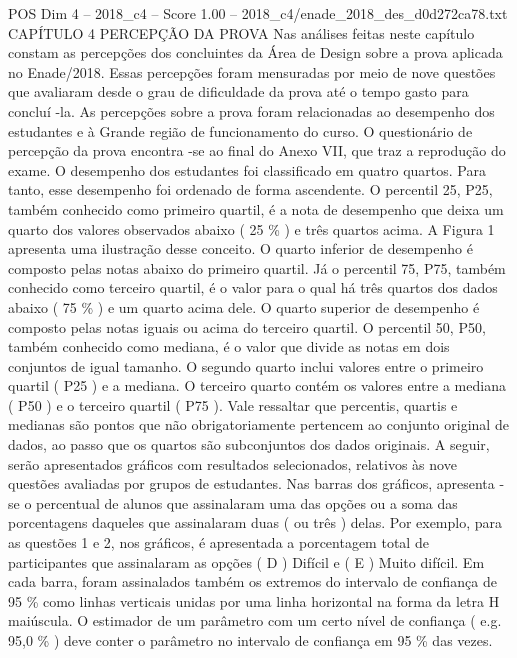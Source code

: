 \begin{textsample}{POS Dim 4 – 2018\_c4 – Score 1.00 – 2018\_c4/enade\_2018\_des\_d0d272ca78.txt}  \label{ex:f4_pos_185}
CAPÍTULO 4 PERCEPÇÃO DA PROVA Nas análises feitas neste capítulo constam as percepções dos concluintes da Área de Design sobre a prova aplicada no Enade/2018.
Essas percepções foram mensuradas por meio de nove questões que avaliaram desde o grau de dificuldade da prova até o tempo gasto para concluí -la.
As percepções sobre a prova foram relacionadas ao desempenho dos estudantes e à Grande região de funcionamento do curso.
O questionário de percepção da prova encontra -se ao final do Anexo VII, que traz a reprodução do exame.
O desempenho dos estudantes foi classificado em quatro quartos.
Para tanto, esse desempenho foi ordenado de forma ascendente.
O percentil 25, P25, também conhecido como primeiro quartil, é a nota de desempenho que deixa um quarto dos valores observados abaixo ( 25 \% ) e três quartos acima.
A Figura 1 apresenta uma ilustração desse conceito.
O quarto inferior de desempenho é composto pelas notas abaixo do primeiro quartil.
Já o percentil 75, P75, também conhecido como terceiro quartil, é o valor para o qual há três quartos dos dados abaixo ( 75 \% ) e um quarto acima dele.
O quarto superior de desempenho é composto pelas notas iguais ou acima do terceiro quartil.
O percentil 50, P50, também conhecido como mediana, é o valor que divide as notas em dois conjuntos de igual tamanho.
O segundo quarto inclui valores entre o primeiro quartil ( P25 ) e a mediana.
O terceiro quarto contém os valores entre a mediana ( P50 ) e o terceiro quartil ( P75 ).
Vale ressaltar que percentis, quartis e medianas são pontos que não obrigatoriamente pertencem ao conjunto original de dados, ao passo que os quartos são subconjuntos dos dados originais.
A seguir, serão apresentados gráficos com resultados selecionados, relativos às nove questões avaliadas por grupos de estudantes.
Nas barras dos gráficos, apresenta -se o percentual de alunos que assinalaram uma das opções ou a soma das porcentagens daqueles que assinalaram duas ( ou três ) delas.
Por exemplo, para as questões 1 e 2, nos gráficos, é apresentada a porcentagem total de participantes que assinalaram as opções ( D ) Difícil e ( E ) Muito difícil.
Em cada barra, foram assinalados também os extremos do intervalo de confiança de 95 \% como linhas verticais unidas por uma linha horizontal na forma da letra H maiúscula.
O estimador de um parâmetro com um certo nível de confiança ( e.g. 95,0 \% ) deve conter o parâmetro no intervalo de confiança em 95 \% das vezes.

\end{textsample}
